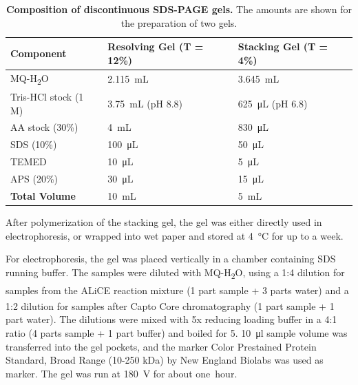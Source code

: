 \begin{table}[h]
    \centering
    \caption{\textbf{Composition of discontinuous SDS-PAGE gels.} The amounts are shown for the preparation of two gels.}
    \label{tab:sds_gels_content}
    \begin{tabular}{@{}lll@{}}
    \toprule
    \textbf{Component} & \textbf{Resolving Gel (T = 12\%)} & \textbf{Stacking Gel (T = 4\%)} \\
    \midrule
    MQ-H\textsubscript{2}O       & \SI{2.115}{\milli\liter} & \SI{3.645}{\milli\liter} \\
    Tris-HCl stock (1 M)                    & \SI{3.75}{\milli\liter} (pH 8.8)  & \SI{625}{\micro\liter} (pH 6.8)  \\
    AA stock (30\%)                                       & \SI{4}{\milli\liter}     & \SI{830}{\micro\liter}   \\
    SDS (10\%)                                            & \SI{100}{\micro\liter}   & \SI{50}{\micro\liter}    \\
    TEMED                                                & \SI{10}{\micro\liter}    & \SI{5}{\micro\liter}     \\
    APS (20\%)                                            & \SI{30}{\micro\liter}    & \SI{15}{\micro\liter}    \\
    \textbf{Total Volume}                                 & \SI{10}{\milli\liter}    & \SI{5}{\milli\liter}     \\
    \bottomrule
    \end{tabular}
\end{table}

After polymerization of the stacking gel, the gel was either directly used in electrophoresis, or wrapped into wet paper and stored at \SI{4}{\degreeCelsius} for up to a week. 

For electrophoresis, the gel was placed vertically in a chamber containing SDS running buffer. The samples were diluted with MQ-H\textsubscript{2}O, using a 1:4 dilution for samples from the ALiCE\textsuperscript{\textregistered} reaction mixture (1 part sample + 3 parts water) and a 1:2 dilution for samples after Capto\textsuperscript{\texttrademark} Core chromatography (1 part sample + 1 part water). The dilutions were mixed with 5x reducing loading buffer in a 4:1 ratio (4 parts sample + 1 part buffer) and boiled for \SI{5}{\min}. \SI{10}{\micro\litre} sample volume was transferred into the gel pockets, and the marker Color Prestained Protein Standard, Broad Range (10-250 kDa) by New England Biolabs was used as marker. The gel was run at \SI{180}{\volt} for about one~hour. 

